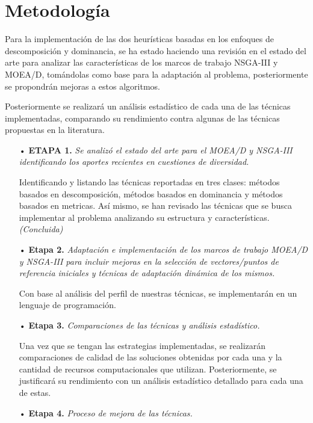 \documentclass[letterpaper,10pt]{article}
\begin{document}
\section{Metodología}

Para la implementación de las dos heurísticas basadas en los enfoques de descomposición y dominancia, se ha estado haciendo una revisión en el estado del arte para analizar las características de los marcos de trabajo NSGA-III y MOEA/D, tomándolas  como  base para la adaptación al problema, posteriormente se propondrán mejoras a estos algoritmos.
 
Posteriormente se realizará un análisis estadístico de cada una de las técnicas implementadas, comparando su rendimiento contra algunas de las  técnicas propuestas en la literatura.
 
 \begin{itemize}
 \item[•] \textbf{ETAPA 1.} \emph{Se analizó el estado del arte para el MOEA/D y NSGA-III identificando los aportes recientes en cuestiones de diversidad.}
\item[] Identificando y listando las técnicas reportadas en tres clases: métodos basados en descomposición, métodos basados en dominancia y métodos basados en metricas. Así mismo, se han revisado las técnicas que se busca implementar al problema analizando su estructura y características.
\emph{(Concluida)}

\item[•] \textbf{Etapa 2.} \emph{Adaptación e implementación de los marcos de trabajo MOEA/D y NSGA-III para incluir mejoras en la selección de vectores/puntos de referencia iniciales y técnicas de adaptación dinámica de los mismos.}

\item[] Con base al análisis del perfil de nuestras técnicas, se implementarán en un lenguaje de programación.
        
\item[•] \textbf{Etapa 3.} \emph{Comparaciones de las técnicas y análisis estadístico.}

\item [] Una vez que se tengan las estrategias implementadas, se realizarán comparaciones de calidad de las soluciones obtenidas por cada una y la cantidad de recursos computacionales  que utilizan. Posteriormente, se justificará su rendimiento con un análisis estadístico detallado para cada  una de estas.

\item[•] \textbf{Etapa 4.} \emph{Proceso de mejora de las técnicas.}


\end{itemize}
\end{document}
